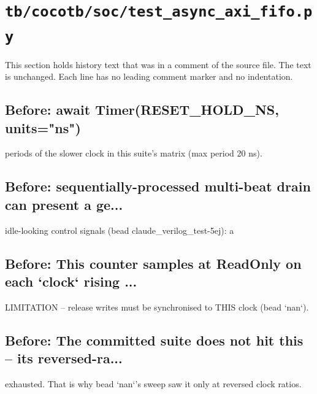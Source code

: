 \section{\texttt{tb/cocotb/soc/test\_async\_axi\_fifo.py}}\label{cr:suite:soc-test-async-axi-fifo}

This section holds history text that was in a comment of the source file. The text is unchanged. Each line has no leading comment marker and no indentation.

\begin{record}

\subsection*{Before: await Timer(RESET\_HOLD\_NS, units="ns")}

\begin{textblock}
periods of the slower clock in this suite's matrix (max period 20 ns).
\end{textblock}

\subsection*{Before: sequentially-processed multi-beat drain can present a ge...}

\begin{textblock}
idle-looking control signals (bead claude_verilog_test-5ej): a
\end{textblock}

\subsection*{Before: This counter samples at ReadOnly on each `clock` rising ...}

\begin{textblock}
LIMITATION -- release writes must be synchronised to THIS clock (bead `nan`).
\end{textblock}

\subsection*{Before: The committed suite does not hit this -- its reversed-ra...}

\begin{textblock}
exhausted. That is why bead `nan`'s sweep saw it only at reversed clock ratios.
\end{textblock}


\end{record}
